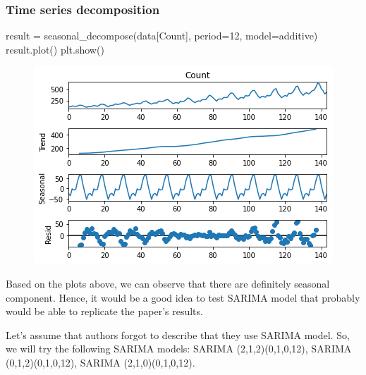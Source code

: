 \documentclass[
  letterpaper,
  DIV=11,
  numbers=noendperiod]{scrartcl}
\newenvironment{Shaded}{\begin{snugshade}}{\end{snugshade}}
\newcommand{\DecValTok}[1]{\textcolor[rgb]{0.68,0.00,0.00}{#1}}
\newcommand{\NormalTok}[1]{\textcolor[rgb]{0.00,0.23,0.31}{#1}}
\newcommand{\OperatorTok}[1]{\textcolor[rgb]{0.37,0.37,0.37}{#1}}
\newcommand{\StringTok}[1]{\textcolor[rgb]{0.13,0.47,0.30}{#1}}
\begin{document}
\hypertarget{time-series-decomposition}{%
\subsubsection{Time series
decomposition}\label{time-series-decomposition}}

\begin{Shaded}
\begin{Highlighting}[]
\NormalTok{result }\OperatorTok{=}\NormalTok{ seasonal\_decompose(data[}\StringTok{\textquotesingle{}Count\textquotesingle{}}\NormalTok{], period}\OperatorTok{=}\DecValTok{12}\NormalTok{, model}\OperatorTok{=}\StringTok{\textquotesingle{}additive\textquotesingle{}}\NormalTok{)}
\NormalTok{result.plot()}
\NormalTok{plt.show()}
\end{Highlighting}
\end{Shaded}

\begin{figure}[H]

{\centering \includegraphics{main_files/figure-pdf/cell-27-output-1.png}

}

\end{figure}

Based on the plots above, we can observe that there are definitely
seasonal component. Hence, it would be a good idea to test SARIMA model
that probably would be able to replicate the paper's results.

Let's assume that authors forgot to describe that they use SARIMA model.
So, we will try the following SARIMA models: SARIMA (2,1,2)(0,1,0,12),
SARIMA (0,1,2)(0,1,0,12), SARIMA (2,1,0)(0,1,0,12).
\end{document}
